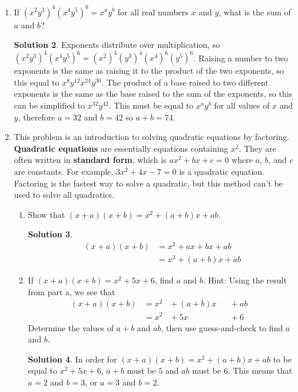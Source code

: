 \documentclass{article}
\theoremstyle{definition}
\newtheorem*{solution}{Solution}
\begin{document}
\begin{enumerate}
\begin{solution}
        \end{solution}
        \item If $(x^2 y^3)^4 (x^4 y^5)^6 = x^a y^b$ for all real numbers $x$ and $y$, what is the sum of $a$ and $b$?
        \begin{solution}
            Exponents distribute over multiplication, so $(x^2 y^3)^4 (x^4 y^5)^6 = (x^2)^4 (y^3)^4 (x^4)^6 (y^5)^6$. Raising a number to two exponents is the same as raising it to the product of the two exponents, so this equal to $x^8 y^{12} x^{24} y^{30}$. The product of a base raised to two different exponents is the same as the base raised to the sum of the exponents, so this can be simplified to $x^{32} y^{42}$. This must be equal to $x^a y^b$ for all values of $x$ and $y$, therefore $a = 32$ and $b = 42$ so $a + b = 74$.
        \end{solution}
        \item This problem is an introduction to solving quadratic equations by factoring. \textbf{Quadratic equations} are essentially equations containing $x^2$. They are often written in \textbf{standard form}, which is $ax^2 + bx + c = 0$ where $a$, $b$, and $c$ are constants. For example, $3x^2 + 4x - 7 = 0$ is a quadratic equation. Factoring is the fastest way to solve a quadratic, but this method can't be used to solve all quadratics.
        \begin{enumerate}
            \item Show that $(x + a)(x + b) = x^2 + (a + b)x + ab$.
            \begin{solution}
                \[\begin{split}
                    (x + a)(x + b) & = x^2 + ax + bx + ab \\
                    & = x^2 + (a + b)x + ab
                \end{split}\]
            \end{solution}
            \item If $(x + a)(x + b) = x^2 + 5x + 6$, find $a$ and $b$. Hint: Using the result from part a, we see that
            \[\begin{alignedat}{3}
                (x + a)(x + b) & = x^2 &{} + (a + b)x &&{} + ab &\\
                & = x^2 &{} + 5x &&{} + 6 &
            \end{alignedat}\]
            Determine the values of $a + b$ and $ab$, then use guess-and-check to find $a$ and $b$.
            \begin{solution}
                In order for $(x + a)(x + b) = x^2 + (a + b)x + ab$ to be equal to $x^2 + 5x + 6$, $a + b$ must be $5$ and $ab$ must be $6$. This means that $a = 2$ and $b = 3$, or $a = 3$ and $b = 2$.

\end{solution}
\end{enumerate}
\end{enumerate}
\end{document}
